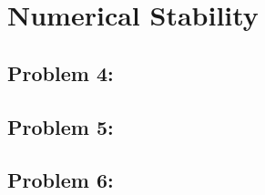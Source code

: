 \documentclass[5pt,a4paper]{article}
\begin{document}
	\section{ Numerical Stability}
	\subsection*{Problem 4:}
	
	\subsection*{Problem 5:}
	\subsection*{Problem 6:}
	
	
\end{document}

